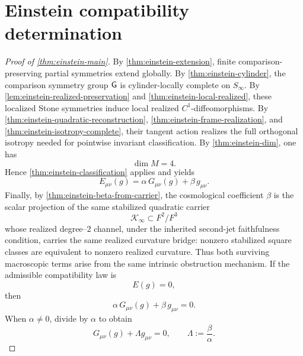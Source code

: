 \section{Einstein compatibility determination}
\label{sec:einstein-proof}
\begin{proof}[Proof of \cref{thm:einstein-main}]
	By \cref{thm:einstein-extension}, finite comparison-preserving partial
	symmetries extend globally.
	By \cref{thm:einstein-cylinder}, the comparison symmetry group \(\mathsf G\) is
	cylinder-locally complete on \(S_\infty\).
	By \cref{lem:einstein-realized-preservation} and
	\cref{thm:einstein-local-realized}, these localized Stone symmetries
	induce local realized \(C^1\)-diffeomorphisms.
	By \cref{thm:einstein-quadratic-reconstruction},
	\cref{thm:einstein-frame-realization}, and
	\cref{thm:einstein-isotropy-complete}, their tangent action realizes
	the full orthogonal isotropy needed for pointwise invariant
	classification.
	By \cref{thm:einstein-dim}, one has
	\[
		\dim M=4.
	\]
	Hence \cref{thm:einstein-classification} applies and yields
	\[
		E_{\mu\nu}(g)=\alpha\,G_{\mu\nu}(g)+\beta\,g_{\mu\nu}.
	\]
	Finally, by \cref{thm:einstein-beta-from-carrier}, the cosmological
	coefficient \(\beta\) is the scalar projection of the same stabilized
	quadratic carrier
	\[
		\mathcal K_\infty\subset F^2/F^3
	\]
	whose realized degree--\(2\) channel, under the inherited second-jet faithfulness condition, carries the same realized curvature bridge:
	nonzero stabilized square classes are equivalent to nonzero realized
	curvature.
	Thus both surviving macroscopic terms arise from the same intrinsic
	obstruction mechanism.
	If the admissible compatibility law is
	\[
		E(g)=0,
	\]
	then
	\[
		\alpha\,G_{\mu\nu}(g)+\beta\,g_{\mu\nu}=0.
	\]
	When \(\alpha\neq 0\), divide by \(\alpha\) to obtain
	\[
		G_{\mu\nu}(g)+\Lambda g_{\mu\nu}=0,
		\qquad
		\Lambda:=\frac{\beta}{\alpha}.
	\]
\end{proof}
